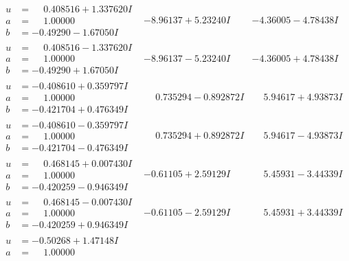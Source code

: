 \documentclass[1p]{elsarticle_modified}
\theoremstyle{definition}
\begin{document}
$$\begin{array}{c|c|c}
\begin{aligned}
u &= \phantom{-}0.408516 + 1.337620 I \\
a &= \phantom{-}1.00000\phantom{ +0.000000I} \\
b &= -0.49290 - 1.67050 I\end{aligned}
 & -8.96137 + 5.23240 I & -4.36005 - 4.78438 I \\ \hline\begin{aligned}
u &= \phantom{-}0.408516 - 1.337620 I \\
a &= \phantom{-}1.00000\phantom{ +0.000000I} \\
b &= -0.49290 + 1.67050 I\end{aligned}
 & -8.96137 - 5.23240 I & -4.36005 + 4.78438 I \\ \hline\begin{aligned}
u &= -0.408610 + 0.359797 I \\
a &= \phantom{-}1.00000\phantom{ +0.000000I} \\
b &= -0.421704 + 0.476349 I\end{aligned}
 & \phantom{-}0.735294 - 0.892872 I & \phantom{-}5.94617 + 4.93873 I \\ \hline\begin{aligned}
u &= -0.408610 - 0.359797 I \\
a &= \phantom{-}1.00000\phantom{ +0.000000I} \\
b &= -0.421704 - 0.476349 I\end{aligned}
 & \phantom{-}0.735294 + 0.892872 I & \phantom{-}5.94617 - 4.93873 I \\ \hline\begin{aligned}
u &= \phantom{-}0.468145 + 0.007430 I \\
a &= \phantom{-}1.00000\phantom{ +0.000000I} \\
b &= -0.420259 - 0.946349 I\end{aligned}
 & -0.61105 + 2.59129 I & \phantom{-}5.45931 - 3.44339 I \\ \hline\begin{aligned}
u &= \phantom{-}0.468145 - 0.007430 I \\
a &= \phantom{-}1.00000\phantom{ +0.000000I} \\
b &= -0.420259 + 0.946349 I\end{aligned}
 & -0.61105 - 2.59129 I & \phantom{-}5.45931 + 3.44339 I \\ \hline\begin{aligned}
u &= -0.50268 + 1.47148 I \\
a &= \phantom{-}1.00000\phantom{ +0.000000I} \\

\end{aligned}
\end{array}$$
\end{document}
